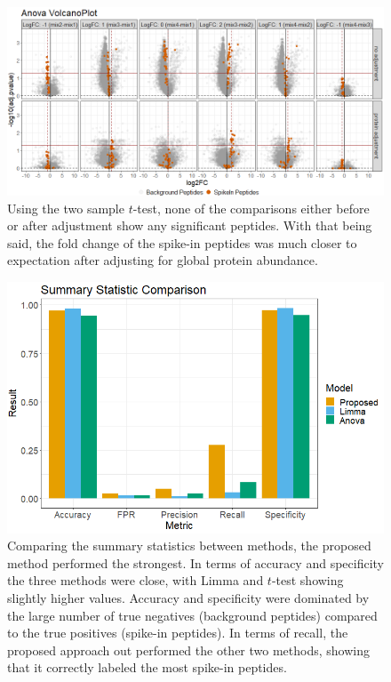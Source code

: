 \documentclass{mcp}
\begin{document}
\begin{figure}[h!]
\centering
\includegraphics[width=1\textwidth]{sim_new/spike_in_anova_volcano}
\caption{Using the two sample $t$-test, none of the comparisons either before or after adjustment show any significant peptides. With that being said, the fold change of the spike-in peptides was much closer to expectation after adjusting for global protein abundance. \label{fig:spike_volcano_ttest}}
\end{figure}

\begin{figure}[h!]
\centering
\includegraphics[width=.85\textwidth]{sim_new/spike_in_statistic_comparison}
\caption{Comparing the summary statistics between methods, the proposed method performed the strongest. In terms of accuracy and specificity the three methods were close, with Limma and $t$-test showing slightly higher values. Accuracy and specificity were dominated by the large number of true negatives (background peptides) compared to the true positives (spike-in peptides). In terms of recall, the proposed approach out performed the other two methods, showing that it correctly labeled the most spike-in peptides. \label{fig:spike_stat}}
\end{figure}
\end{document}
